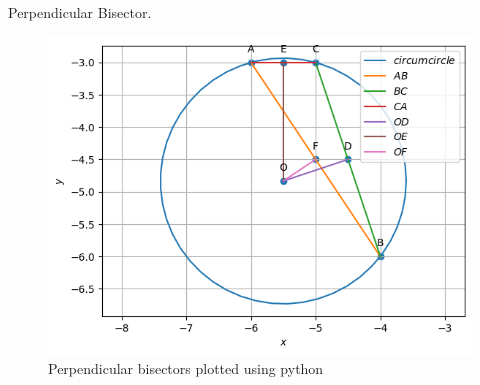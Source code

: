 \begin{table}[H]
        \caption{Perpendicular Bisector.}
        \centering
        
    \end{table}
\begin{figure}[H]
\includegraphics[width=\columnwidth]{1.4/figs/1.4.png}
\caption{Perpendicular bisectors plotted using python}
\label{fig:i_1.4_py}
\end{figure}

